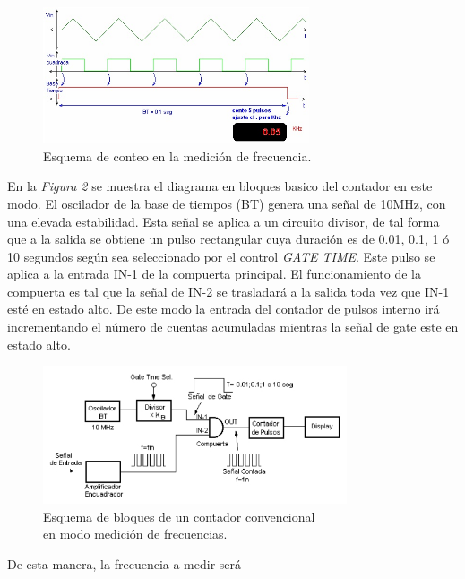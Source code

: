 \documentclass{article}
\begin{document}
\begin{figure}[h]
	\centering
	\includegraphics[width=0.70\textwidth]{images/01-ondasFrecuenciaContador.jpg}
	\medskip
	\caption{Esquema de conteo en la medición de frecuencia.}
\end{figure}
\bigskip\bigskip

	
	En la \textit{Figura 2} se muestra el diagrama en bloques basico del contador en este modo. El oscilador de la base de tiempos (BT) genera una señal de 10MHz, con una elevada estabilidad. Esta señal se aplica a un circuito divisor, de tal forma que a la salida se obtiene un pulso rectangular cuya duración es de 0.01, 0.1, 1 ó 10 segundos según sea seleccionado por el control \textit{GATE TIME}. Este pulso se aplica a la entrada IN-1 de la compuerta principal. El funcionamiento de la compuerta es tal que la señal de IN-2 se trasladará a la salida toda vez que IN-1 esté en estado alto. De este modo la entrada del contador de pulsos interno irá incrementando el número de cuentas acumuladas mientras la señal de gate este en estado alto. 


\newpage
\begin{figure}[h]
	\centering
	\includegraphics[width=0.80\textwidth]{images/02-diagrama-en-bloques-modo-medicion-frecuencia.jpg}
	\medskip
	\caption{Esquema de bloques de un contador convencional\\ en modo medición de frecuencias.}
\end{figure}
\bigskip\bigskip


	De esta manera, la frecuencia a medir será
\medskip
\end{document}
